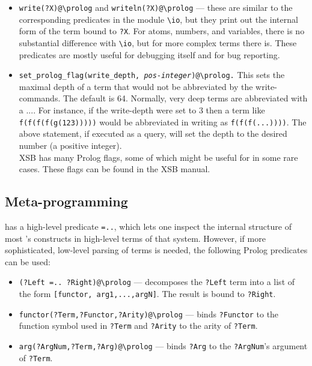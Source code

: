 \documentclass[11pt]{article}
\newcommand{\ERGO}{\mbox{\smaller{\ensuremath{\cal{E}}\smaller{{\sc{RGO}}}}}\xspace}
\newcommand{\FLSYSTEM}{\ERGO}
\newcommand{\bs}{\textbackslash}
\begin{document}
\begin{itemize}
\item  \texttt{write(?X)@\bs{}prolog} and \texttt{writeln(?X)@\bs{}prolog}
  --- these are similar to the corresponding predicates in the \FLSYSTEM module
  \texttt{\bs{}io}, but they print out the internal form of the term bound
  to \texttt{?X}. For atoms, numbers, and variables, there is no
  substantial difference with \texttt{\bs{}io}, but for more complex terms
  there is. These predicates are mostly useful for debugging \FLSYSTEM
  itself and for bug reporting.
\item \texttt{set\_prolog\_flag(write\_depth, {\it pos-integer\/})@\bs{}prolog.}
  This sets the maximal depth of a term that would not be abbreviated by
  the write-commands. The default is 64.
  Normally, very deep terms are abbreviated with a .... For instance, if
  the write-depth were set to 3 then a term like \texttt{f(f(f(f(g(123)))))}
  would be abbreviated in writing as \texttt{f(f(f(...))))}.  
  The above statement, if executed as a query, will set the depth to the
  desired number (a positive integer).
  \\
  XSB has many Prolog flags, some of which might be useful for \FLSYSTEM in
  some rare cases. These flags can be found in the XSB manual.
\end{itemize}

\subsection{Meta-programming}

\FLSYSTEM has a high-level predicate \texttt{=..}, which lets one inspect
the internal structure of most \FLSYSTEM's constructs in high-level terms of 
that system. However, if more sophisticated, low-level
parsing of terms is needed, the following Prolog predicates can be used:
\begin{itemize}
\item  \texttt{(?Left =.. ?Right)@\bs{}prolog} ---   decomposes the
  \texttt{?Left} term into a list of the form
  \texttt{[functor, arg1,...,argN]}. The result is bound to \texttt{?Right}.
\item \texttt{functor(?Term,?Functor,?Arity)@\bs{}prolog} --- binds
  \texttt{?Functor} to the function symbol used in \texttt{?Term} and
  \texttt{?Arity} to the arity of \texttt{?Term}.
\item \texttt{arg(?ArgNum,?Term,?Arg)@\bs{}prolog} --- binds \texttt{?Arg}
  to the \texttt{?ArgNum}'s argument of \texttt{?Term}.   
\end{itemize}
\end{document}
